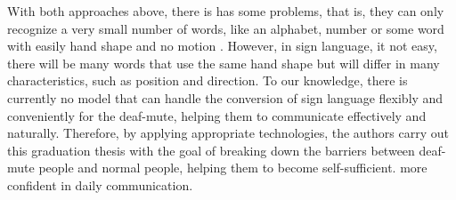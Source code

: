   With both approaches above, there is has some problems, that is, they can only recognize 
  a very small number of words, like an alphabet, number or some word with easily hand shape and no motion .
  However, in sign language, it not easy, there will be many words 
  that use the same hand shape but will differ in many characteristics, such as position 
  and direction. To our knowledge, there is currently no model that can handle the 
  conversion of sign language flexibly and conveniently for the deaf-mute, helping them 
  to communicate effectively and naturally. Therefore, by applying appropriate 
  technologies, the authors carry out this graduation thesis with the goal of breaking down 
  the barriers between deaf-mute people and normal people, helping them to become self-sufficient. 
  more confident in daily communication.

